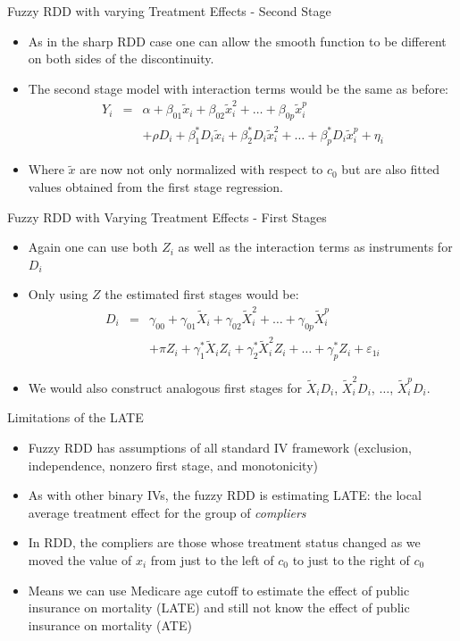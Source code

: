 \documentclass{beamer}
\begin{document}
\begin{frame}{Fuzzy RDD with varying Treatment Effects - Second Stage}
	
	\begin{itemize}
	\item As in the sharp RDD case one can allow the smooth function to be different on both sides of the discontinuity.
	\item The second stage model with interaction terms would be the same as before:
		\begin{eqnarray*}
		Y_i &=& \alpha + \beta_{01}\tilde{x}_i + \beta_{02}\tilde{x}_i^2 + \dots + \beta_{0p}\tilde{x}_i^p \\
		& & + \rho D_i + \beta_1^*D_i\tilde{x}_i + \beta_2^*D_i\tilde{x}_i^2 + \dots + \beta_p^*D_i\tilde{x}_i^p + \eta_i
		\end{eqnarray*}
	\item Where $\tilde{x}$ are now not only normalized with respect to $c_0$ but are also fitted values obtained from the first stage regression.
	\end{itemize}
\end{frame}

\begin{frame}{Fuzzy RDD with Varying Treatment Effects - First Stages}
	
	\begin{itemize}
	\item Again one can use both $Z_i$ as well as the interaction terms as instruments for $D_i$
	\item Only using $Z$ the estimated first stages would be:
		\begin{eqnarray*}
		D_i &=& \gamma_{00} + \gamma_{01}\tilde{X}_i + \gamma_{02}\tilde{X}_i^2 + \dots + \gamma_{0p}\tilde{X}_i^p \\
		& & + \pi Z_i + \gamma_1^*\tilde{X}_iZ_i + \gamma_2^* \tilde{X}_i^2Z_i + \dots + \gamma_p^*Z_i + \varepsilon_{1i}
		\end{eqnarray*}
	\item We would also construct analogous first stages for $\tilde{X}_iD_i$, $\tilde{X}_i^2D_i$, $\dots$, $\tilde{X}_i^pD_i$.
	\end{itemize}
\end{frame}

\begin{frame}{Limitations of the LATE}
	
	\begin{itemize}
	\item Fuzzy RDD has assumptions of all standard IV framework (exclusion, independence, nonzero first stage, and monotonicity)
	\item As with other binary IVs, the fuzzy RDD is estimating LATE: the local average treatment effect for the group of \emph{compliers}
	\item In RDD, the compliers are those whose treatment status changed as we moved the value of $x_i$ from just to the left of $c_0$ to just to the right of $c_0$
	\item Means we can use Medicare age cutoff to estimate the effect of public insurance on mortality (LATE) and still not know the effect of public insurance on mortality (ATE)
	\end{itemize}
\end{frame}
\end{document}
